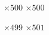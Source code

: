 \documentclass{standalone}
\begin{document}
\begin{boxmodel}
$\times 500$ \hspace{2pt} $\times 500$
\end{boxmodel} \begin{boxmodel}
$\times 499$ \hspace{2pt} $\times 501$
\end{boxmodel}
\end{document}
